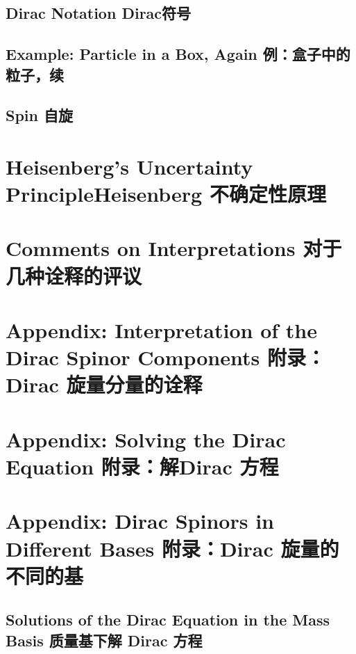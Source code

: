 \subsection[Dirac符号]{Dirac Notation Dirac符号}\label{sec8.5.3}
\subsection[例：盒子中的粒子，续]{Example: Particle in a Box, Again 例：盒子中的粒子，续}\label{sec8.5.4}
\subsection[自旋]{Spin 自旋}\label{sec8.5.5}
\section[Heisenberg 不确定性原理]{Heisenberg’s Uncertainty PrincipleHeisenberg 不确定性原理}\label{sec8.6}
\section[对于几种诠释的评议]{Comments on Interpretations 对于几种诠释的评议}\label{sec8.7}
\section[附录：Dirac 旋量分量的诠释]{Appendix: Interpretation of the Dirac Spinor Components 附录：Dirac 旋量分量的诠释}\label{sec8.8}
\section[附录：解Dirac 方程]{Appendix: Solving the Dirac Equation 附录：解Dirac 方程}\label{sec8.9}
\section[附录：Dirac 旋量的不同的基]{Appendix: Dirac Spinors in Different Bases 附录：Dirac 旋量的不同的基}\label{sec8.10}
\subsection[质量基下解 Dirac 方程]{Solutions of the Dirac Equation in the Mass Basis 质量基下解 Dirac 方程}\label{sec8.10.1}









